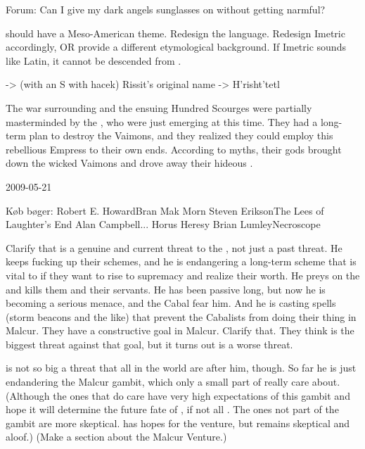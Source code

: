 Forum: Can I give my dark angels sunglasses on without getting narmful?

\Ortaica should have a Meso-American theme. 
Redesign the language.
Redesign Imetric accordingly, OR provide a different etymological background. If Imetric sounds like Latin, it cannot be descended from \Ortaican. 

\Nasshikerr -> \Nasshikerr (with an S with hacek)
Rissit's original name -> H'risht'tetl

The war surrounding \Belzir and the ensuing Hundred Scourges were partially masterminded by the \taorthae, who were just emerging at this time. 
They had a long-term plan to destroy the Vaimons, and they realized they could employ this rebellious Empress to their own ends. 
According to \Ortaican myths, their gods brought down the wicked Vaimons and drove away their hideous \Archons. 



2009-05-21

Køb bøger:
Robert E. Howard\dash{}Bran Mak Morn
Steven Erikson\dash{}The Lees of Laughter's End
Alan Campbell\dash{}...
Horus Heresy
Brian Lumley\dash{}Necroscope

Clarify that \Ishnaruchaefir is a genuine and current threat to the \resphain, not just a past threat.
He keeps fucking up their schemes, and he is endangering a long-term scheme that is vital to \CiriathSepher if they want to rise to supremacy and realize their worth.
He preys on the \resphain and kills them and their servants. 
He has been passive long, but now he is becoming a serious menace, and the Cabal fear him.
And he is casting spells (storm beacons and the like) that prevent the Cabalists from doing their thing in Malcur.
They have a constructive goal in Malcur. 
Clarify that.
They think \Ishnaruchaefir is the biggest threat against that goal, but it turns out \Secherdamon is a worse threat. 

\Ishnaruchaefir is not so big a threat that all \resphain in the world are after him, though.
So far he is just endandering the Malcur gambit, which only a small part of \CiriathSepher really care about. 
(Although the ones that do care have very high expectations of this gambit and hope it will determine the future fate of \CiriathSepher, if not all \resphain. The ones not part of the gambit are more skeptical. \Azraid has hopes for the venture, but remains skeptical and aloof.)
(Make a section about the \CiriathSepher Malcur Venture.)

